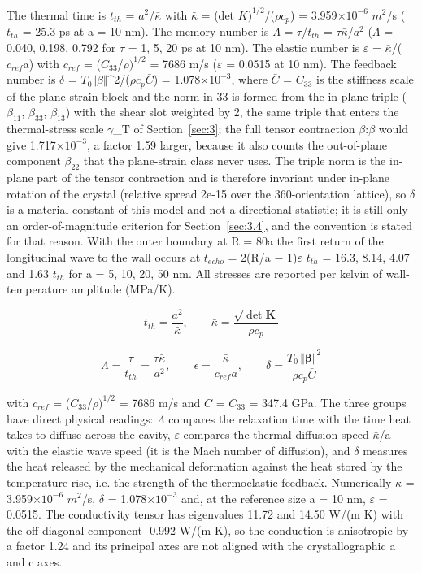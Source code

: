 \documentclass[preprint,12pt]{elsarticle}
\begin{document}
The thermal time is $t_{th}$ = $a^{2}$/$\bar{\kappa}$ with $\bar{\kappa}$ = (det $K)^{1/2}$/($\rho c_{p}$) = 3.959$\times 10^{-6}$ $m^{2}$/s ($t_{th}$ = 25.3 ps at a = 10 nm). The memory number is $\Lambda$ = $\tau$/$t_{th}$ = $\tau \bar{\kappa}$/$a^{2}$ ($\Lambda$ = 0.040, 0.198, 0.792 for $\tau$ = 1, 5, 20 ps at 10 nm). The elastic number is $\varepsilon$ = $\bar{\kappa}$/($c_{ref}$a) with $c_{ref}$ = ($C_{33}$/$\rho)^{1/2}$ = 7686 m/s ($\varepsilon$ = 0.0515 at 10 nm). The feedback number is $\delta$ = $T_{0}\Vert \beta \Vert$^{2}/($\rho c_{p}\bar{C}$) = 1.078$\times 10^{-3}$, where $\bar{C}$ = $C_{33}$ is the stiffness scale of the plane-strain block and the norm in 33 is formed from the in-plane triple ($\beta_{11}$, $\beta_{33}$, $\beta_{13}$) with the shear slot weighted by 2, the same triple that enters the thermal-stress scale $\gamma$\_T of Section~\ref{sec:3}; the full tensor contraction $\beta$:$\beta$ would give 1.717$\times 10^{-3}$, a factor 1.59 larger, because it also counts the out-of-plane component $\beta_{22}$ that the plane-strain class never uses. The triple norm is the in-plane part of the tensor contraction and is therefore invariant under in-plane rotation of the crystal (relative spread 2e-15 over the 360-orientation lattice), so $\delta$ is a material constant of this model and not a directional statistic; it is still only an order-of-magnitude criterion for Section~\ref{sec:3.4}, and the convention is stated for that reason. With the outer boundary at R = 80a the first return of the longitudinal wave to the wall occurs at $t_{echo}$ = 2(R/a $-$ 1)$\varepsilon$ $t_{th}$ = 16.3, 8.14, 4.07 and 1.63 $t_{th}$ for a = 5, 10, 20, 50 nm. All stresses are reported per kelvin of wall-temperature amplitude (MPa/K).

\begin{equation}
t_{th}=\frac{a^2}{\bar\kappa},\qquad \bar\kappa=\frac{\sqrt{\det\mathbf{K}}}{\rho c_p} 
\label{eq:32}
\end{equation}

\begin{equation}
\Lambda=\frac{\tau}{t_{th}}=\frac{\tau\bar\kappa}{a^2},\qquad \epsilon=\frac{\bar\kappa}{c_{ref}a},\qquad \delta=\frac{T_0\,\Vert\boldsymbol{\beta}\Vert^{2}}{\rho c_p\bar C} 
\label{eq:33}
\end{equation}

with $c_{ref}$ = ($C_{33}$/$\rho)^{1/2}$ = 7686 m/s and $\bar{C}$ = $C_{33}$ = 347.4 GPa. The three groups have direct physical readings: $\Lambda$ compares the relaxation time with the time heat takes to diffuse across the cavity, $\varepsilon$ compares the thermal diffusion speed $\bar{\kappa}$/a with the elastic wave speed (it is the Mach number of diffusion), and $\delta$ measures the heat released by the mechanical deformation against the heat stored by the temperature rise, i.e. the strength of the thermoelastic feedback. Numerically $\bar{\kappa}$ = 3.959$\times 10^{-6}$ $m^{2}$/s, $\delta$ = 1.078$\times 10^{-3}$ and, at the reference size a = 10 nm, $\varepsilon$ = 0.0515. The conductivity tensor has eigenvalues 11.72 and 14.50 W/(m K) with the off-diagonal component -0.992 W/(m K), so the conduction is anisotropic by a factor 1.24 and its principal axes are not aligned with the crystallographic a and c axes.
\end{document}

